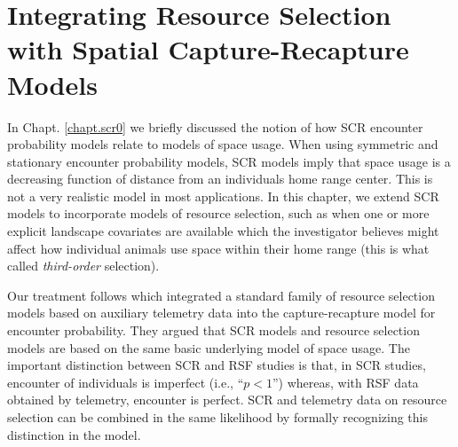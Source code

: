 \chapter{
Integrating Resource Selection
with
Spatial Capture-Recapture
Models}

\label{chapt.rsf}

\vspace{.3in}


In Chapt. \ref{chapt.scr0} we briefly discussed the notion of how
SCR encounter probability models relate to models of space usage.
When using symmetric and stationary encounter probability models, SCR
models imply that space usage is a decreasing function of distance
from an individuals home range center. This is not a very realistic
model in most applications.  In this chapter, we extend SCR
models to incorporate models of resource selection,
such as when
one or more explicit landscape covariates are available which the
investigator believes might affect how individual animals use space
within their home range (this is what \citet{johnson:1980} called {\it
  third-order} selection).  
  
  
Our treatment follows
\citet{royle_etal:2012mee} which integrated a standard family of
resource selection models based on auxiliary telemetry data into the
capture-recapture model for encounter probability.
They  argued that SCR models and resource
selection models \citep{manly_etal:2002} are based on the same basic
underlying model of space usage. The important distinction between SCR
and RSF studies is that, in SCR studies, encounter of individuals is
imperfect (i.e., ``$p<1$'') whereas, with RSF data obtained by
telemetry, encounter is perfect. 
SCR and telemetry data on resource selection can be combined in the
same likelihood by formally recognizing this distinction in the model.  

